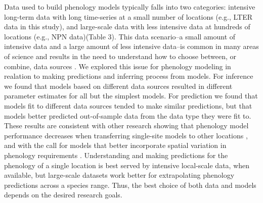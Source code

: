 \documentclass[fleqn,12pt,lineno]{wlpeerj} %
\begin{document}
Data used to build phenology models typically falls into two categories: intensive long-term data with long time-series at a small number of locations (e.g., LTER data in this study), and large-scale data with less intensive data at hundreds of locations (e.g., NPN data)(Table 3). This data scenario--a small amount of intensive data and a large amount of less intensive data--is common in many areas of science and results in the need to understand how to choose between, or combine, data sources \citep{hanks2018}. We explored this issue for phenology modeling in realation to making predictions and inferring process from models. For inference we found that models based on different data sources resulted in different parameter estimates for all but the simplest models. For prediction we found that models fit to different data sources tended to make similar predictions, but that models better predicted out-of-sample data from the data type they were fit to. These results are consistent with other research showing that phenology model performance decreases when transferring single-site models to other locations \citep{garcia-mozo2008, xu2013, basler2016}, and with the call for models that better incorporate spatial variation in phenology requirements \citep{richardson2013, chuine2017}. Understanding and making predictions for the phenology of a single location is best served by intensive local-scale data, when available, but large-scale datasets work better for extrapolating phenology predictions across a species range. Thus, the best choice of both data and models depends on the desired research goals.
\end{document}
